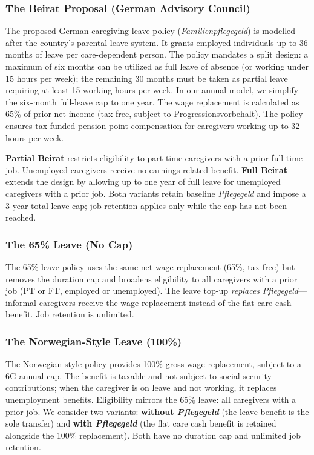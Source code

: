 \subsubsection{The Beirat Proposal (German Advisory Council)}

The proposed German caregiving leave policy (\textit{Familienpflegegeld}) is modelled after the country's parental leave system. It grants employed individuals up to 36 months of leave per care-dependent person. The policy mandates a split design: a maximum of six months can be utilized as full leave of absence (or working under 15 hours per week); the remaining 30 months must be taken as partial leave requiring at least 15 working hours per week. In our annual model, we simplify the six-month full-leave cap to one year. The wage replacement is calculated as 65\% of prior net income (tax-free, subject to Progressionsvorbehalt). The policy ensures tax-funded pension point compensation for caregivers working up to 32 hours per week.

\textbf{Partial Beirat} restricts eligibility to part-time caregivers with a prior full-time job. Unemployed caregivers receive no earnings-related benefit. \textbf{Full Beirat} extends the design by allowing up to one year of full leave for unemployed caregivers with a prior job. Both variants retain baseline \textit{Pflegegeld} and impose a 3-year total leave cap; job retention applies only while the cap has not been reached.

\subsubsection{The 65\% Leave (No Cap)}

The 65\% leave policy uses the same net-wage replacement (65\%, tax-free) but removes the duration cap and broadens eligibility to all caregivers with a prior job (PT or FT, employed or unemployed). The leave top-up \textit{replaces} \textit{Pflegegeld}---informal caregivers receive the wage replacement instead of the flat care cash benefit. Job retention is unlimited.

\subsubsection{The Norwegian-Style Leave (100\%)}

The Norwegian-style policy provides 100\% gross wage replacement, subject to a 6G annual cap. The benefit is taxable and not subject to social security contributions; when the caregiver is on leave and not working, it replaces unemployment benefits. Eligibility mirrors the 65\% leave: all caregivers with a prior job. We consider two variants: \textbf{without \textit{Pflegegeld}} (the leave benefit is the sole transfer) and \textbf{with \textit{Pflegegeld}} (the flat care cash benefit is retained alongside the 100\% replacement). Both have no duration cap and unlimited job retention.

